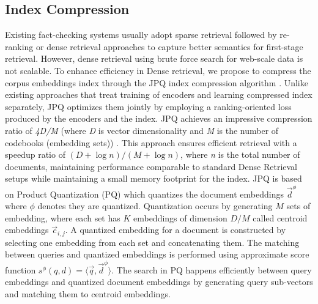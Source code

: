 \subsection{Index Compression}
Existing fact-checking systems usually adopt sparse retrieval followed by re-ranking or dense retrieval approaches to capture better semantics for first-stage retrieval. However, dense retrieval using brute force search for web-scale data is not scalable. To enhance efficiency in Dense retrieval, we propose to compress the corpus embeddings index through the JPQ index compression algorithm \cite{zhan2021jointly}. Unlike existing approaches that treat training of encoders and learning compressed index separately, JPQ optimizes them jointly by employing a ranking-oriented loss produced by the encoders and the index. JPQ achieves an impressive compression ratio of \textit{4D/M} (where \textit{D} is vector dimensionality and \textit{M} is the number of codebooks (embedding sets)) \cite{zhan2021jointly}. This approach ensures efficient retrieval with a speedup ratio of $({D + \log n})/({M + \log n})$, where \textit{n} is the total number of documents, maintaining performance comparable to standard Dense Retrieval setups while maintaining a small memory footprint for the index. JPQ is based on Product Quantization (PQ) which quantizes the document embeddings $\vec{d}^\phi$ where $\phi$ denotes they are quantized. Quantization occurs by generating $M$ sets of embedding, where each set has $K$ embeddings of dimension $D/M$ called centroid embeddings $\vec{c}_{i,j}$. A quantized embedding for a document is constructed by selecting one embedding from each set and concatenating them. The matching between queries and quantized embeddings is performed using approximate score function $s^\phi(q, d) = \langle \vec{q},\vec{d}^\phi \rangle$. The search in PQ happens efficiently between query embeddings and quantized document embeddings by generating query sub-vectors and matching them to centroid embeddings.\\

